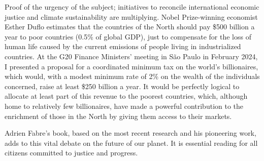 \documentclass[a5paper,english,openany]{memoir}
\begin{document}
Proof of the urgency of the subject; %
initiatives to reconcile international economic justice and climate sustainability are multiplying. Nobel Prize-winning economist Esther Duflo estimates that the countries of the North should pay \$500 billion a year to poor countries (0.5\% of global GDP), just to compensate for the loss of human life caused by the current emissions of people living in industrialized countries. At the G20 Finance Ministers' meeting in São Paulo in February 2024, I presented a proposal for a coordinated minimum tax on the world's billionaires, which would, with a modest minimum rate of 2\% on the wealth of the individuals concerned, raise at least \$250 billion a year. It would be perfectly logical to allocate at least part of this revenue to the poorest countries, which, although home to relatively few billionaires, have made a powerful contribution to the enrichment of those in the North by giving them access to their markets. 

Adrien Fabre's book, based on the most recent research and his pioneering work, adds to this vital debate on the future of our planet. It is essential reading for all citizens committed to justice and progress.
\end{document}
